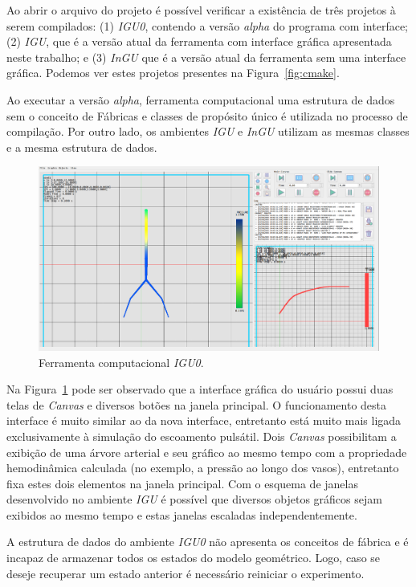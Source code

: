 Ao abrir o arquivo do projeto é possível verificar a existência de três projetos à serem compilados: (1) \textit{IGU0}, contendo a versão \textit{alpha} do programa com interface; (2) \textit{IGU}, que é a versão atual da ferramenta com interface gráfica apresentada neste trabalho; e (3) \textit{InGU} que é a versão atual da ferramenta sem uma interface gráfica. Podemos ver estes projetos presentes na Figura~\ref{fig:cmake}.

Ao executar a versão \textit{alpha}, ferramenta computacional uma estrutura de dados sem o conceito de Fábricas e classes de propósito único é utilizada no processo de compilação. Por outro lado, os ambientes \textit{IGU} e \textit{InGU} utilizam as mesmas classes e a mesma estrutura de dados.


\begin{figure}[!htbp]
	\centering
	\includegraphics[width=\linewidth]{Figures/IGU_old2.png}
	\caption{Ferramenta computacional \textit{IGU0}.}
	\label{fig:IGU-old}
\end{figure}

Na Figura~\ref{fig:IGU-old} pode ser observado que a interface gráfica do usuário possui duas telas de \textit{Canvas} e diversos botões na janela principal. O funcionamento desta interface é muito similar ao da nova interface, entretanto está muito mais ligada exclusivamente à simulação do escoamento pulsátil. Dois \textit{Canvas} possibilitam a exibição de uma árvore arterial e seu gráfico ao mesmo tempo com a propriedade hemodinâmica calculada (no exemplo, a pressão ao longo dos vasos), entretanto fixa estes dois elementos na janela principal. Com o esquema de janelas desenvolvido no ambiente \textit{IGU} é possível que diversos objetos gráficos sejam exibidos ao mesmo tempo e estas janelas escaladas independentemente.

A estrutura de dados do ambiente \textit{IGU0} não apresenta os conceitos de fábrica e é incapaz de armazenar todos os estados do modelo geométrico. Logo, caso se deseje recuperar um estado anterior é necessário reiniciar o experimento.

